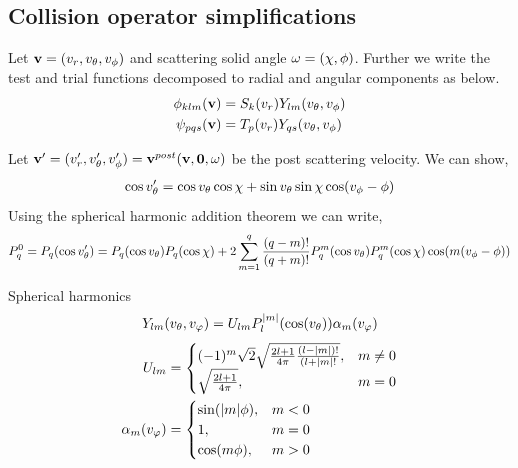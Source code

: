 \documentclass{article}[draft]
\begin{document}
\subsection{Collision operator simplifications}
\label{sec:collop_simplifications}
Let $\mathbf{v} = (v_r, v_\theta, v_\phi) $ and scattering solid angle $\mathbf{\omega} = (\chi, \phi)$. Further we write the test and trial functions decomposed to radial and angular components as below. 
\begin{align*}
\phi_{klm}\of{\vect{v}} &= S_{k}\of{v_r} Y_{lm} \of{v_\theta, v_\phi}\\
\psi_{pqs}\of{\vect{v}} &= T_{p}\of{v_r} Y_{qs} \of{v_\theta, v_\phi}
\end{align*}

Let $\vect{v}^{\prime} = (v_r^\prime, v_\theta^\prime, v_\phi^\prime) =\vect{v}^{post}\of{\vect{v},\vect{0},\vect{\omega}}$ be the post scattering velocity. We can show, 
\begin{align*}
\cos v_\theta^\prime = \cos v_\theta \cos\chi + \sin v_\theta \sin \chi \cos\of{v_\phi-\phi}
\end{align*} Using the spherical harmonic addition theorem we can write, 
\begin{align*}
P_q^{0} = P_q\of{\cos v_\theta^\prime} =  P_q\of{\cos v_\theta} P_q\of{\cos \chi} + 2\sum_{m=1}^{q} \frac{(q-m)!}{(q+m)!} P_q^{m}\of{\cos v_\theta} P_q^{m}\of{\cos \chi} \cos \of{ m (v_\phi-\phi)}
\end{align*}

Spherical harmonics
\begin{align*}
Y_{lm}\of{\vtheta,\vphi} = U_{lm} P^{|m|}_l\of{\cos\of{\vtheta}} \alpha_m\of{\vphi}
\end{align*}
\begin{align*}
U_{lm} &= 
\begin{cases}
(-1)^m \sqrt{2} \sqrt{\frac{2l+1}{4\pi} \frac{(l-|m|)!}{(l+|m|!}}, &m\neq 0 \\
\sqrt{\frac{2l+1}{4\pi}}, &m = 0
\end{cases}
\\
\alpha_m\of{\vphi}
&=
\begin{cases}
\sin\of{|m|\phi}, &m < 0 \\
1, &m = 0\\
\cos\of{m\phi}, &m > 0
\end{cases}
\end{align*}
\end{document}
